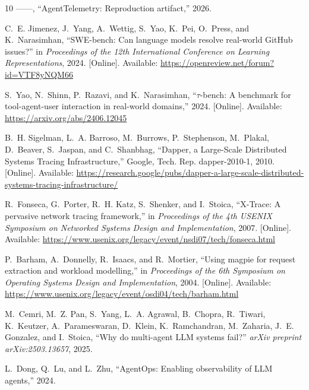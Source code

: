 \documentclass[conference]{IEEEtran}
\begin{document}
\begin{thebibliography}{10}
------, ``{AgentTelemetry}: Reproduction artifact,'' 2026.

\BIBentryALTinterwordspacing
C.~E. Jimenez, J.~Yang, A.~Wettig, S.~Yao, K.~Pei, O.~Press, and K.~Narasimhan,
  ``{SWE-bench}: Can language models resolve real-world {GitHub} issues?'' in
  \emph{Proceedings of the 12th International Conference on Learning
  Representations}, 2024. [Online]. Available:
  \url{https://openreview.net/forum?id=VTF8yNQM66}
\BIBentrySTDinterwordspacing

\BIBentryALTinterwordspacing
S.~Yao, N.~Shinn, P.~Razavi, and K.~Narasimhan, ``$\tau$-bench: A benchmark for
  tool-agent-user interaction in real-world domains,'' 2024. [Online].
  Available: \url{https://arxiv.org/abs/2406.12045}
\BIBentrySTDinterwordspacing

\BIBentryALTinterwordspacing
B.~H. Sigelman, L.~A. Barroso, M.~Burrows, P.~Stephenson, M.~Plakal, D.~Beaver,
  S.~Jaspan, and C.~Shanbhag, ``{Dapper, a Large-Scale Distributed Systems
  Tracing Infrastructure},'' Google, Tech. Rep. dapper-2010-1, 2010. [Online].
  Available:
  \url{https://research.google/pubs/dapper-a-large-scale-distributed-systems-tracing-infrastructure/}
\BIBentrySTDinterwordspacing

\BIBentryALTinterwordspacing
R.~Fonseca, G.~Porter, R.~H. Katz, S.~Shenker, and I.~Stoica, ``{X-Trace}: A
  pervasive network tracing framework,'' in \emph{Proceedings of the 4th USENIX
  Symposium on Networked Systems Design and Implementation}, 2007. [Online].
  Available: \url{https://www.usenix.org/legacy/event/nsdi07/tech/fonseca.html}
\BIBentrySTDinterwordspacing

\BIBentryALTinterwordspacing
P.~Barham, A.~Donnelly, R.~Isaacs, and R.~Mortier, ``Using magpie for request
  extraction and workload modelling,'' in \emph{Proceedings of the 6th
  Symposium on Operating Systems Design and Implementation}, 2004. [Online].
  Available: \url{https://www.usenix.org/legacy/event/osdi04/tech/barham.html}
\BIBentrySTDinterwordspacing

M.~Cemri, M.~Z. Pan, S.~Yang, L.~A. Agrawal, B.~Chopra, R.~Tiwari, K.~Keutzer,
  A.~Parameswaran, D.~Klein, K.~Ramchandran, M.~Zaharia, J.~E. Gonzalez, and
  I.~Stoica, ``Why do multi-agent {LLM} systems fail?'' \emph{arXiv preprint
  arXiv:2503.13657}, 2025.

L.~Dong, Q.~Lu, and L.~Zhu, ``{AgentOps}: Enabling observability of {LLM}
  agents,'' 2024.


\end{thebibliography}
\end{document}

